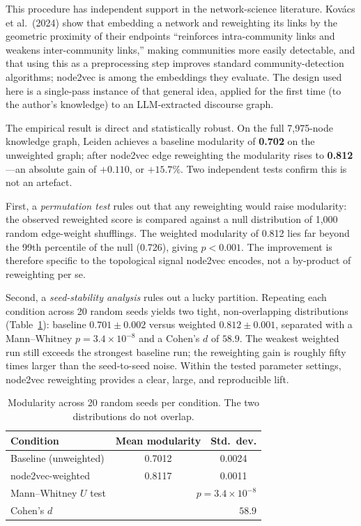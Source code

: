 \documentclass[11pt]{article}
\begin{document}
This procedure has independent support in the network-science literature. Kov\'{a}cs et al.\ (2024) show that embedding a network and reweighting its links by the geometric proximity of their endpoints ``reinforces intra-community links and weakens inter-community links,'' making communities more easily detectable, and that using this as a preprocessing step improves standard community-detection algorithms; node2vec is among the embeddings they evaluate. The design used here is a single-pass instance of that general idea, applied for the first time (to the author's knowledge) to an LLM-extracted discourse graph.

The empirical result is direct and statistically robust. On the full 7{,}975-node knowledge graph, Leiden achieves a baseline modularity of \textbf{0.702} on the unweighted graph; after node2vec edge reweighting the modularity rises to \textbf{0.812}---an absolute gain of $+0.110$, or $+15.7\%$. Two independent tests confirm this is not an artefact.

First, a \emph{permutation test} rules out that any reweighting would raise modularity: the observed reweighted score is compared against a null distribution of 1{,}000 random edge-weight shufflings. The weighted modularity of 0.812 lies far beyond the 99th percentile of the null (0.726), giving $p<0.001$. The improvement is therefore specific to the topological signal node2vec encodes, not a by-product of reweighting per se.

Second, a \emph{seed-stability analysis} rules out a lucky partition. Repeating each condition across 20 random seeds yields two tight, non-overlapping distributions (Table~\ref{tab:seed}): baseline $0.701 \pm 0.002$ versus weighted $0.812 \pm 0.001$, separated with a Mann--Whitney $p = 3.4\times10^{-8}$ and a Cohen's $d$ of $58.9$. The weakest weighted run still exceeds the strongest baseline run; the reweighting gain is roughly fifty times larger than the seed-to-seed noise. Within the tested parameter settings, node2vec reweighting provides a clear, large, and reproducible lift.

\begin{table}[h]
\centering
\small
\caption{Modularity across 20 random seeds per condition. The two distributions do not overlap.}
\label{tab:seed}
\begin{tabular}{lcc}
\toprule
\textbf{Condition} & \textbf{Mean modularity} & \textbf{Std.\ dev.} \\
\midrule
Baseline (unweighted) & 0.7012 & 0.0024 \\
node2vec-weighted     & 0.8117 & 0.0011 \\
\midrule
Mann--Whitney $U$ test & \multicolumn{2}{r}{$p = 3.4\times10^{-8}$} \\
Cohen's $d$            & \multicolumn{2}{r}{$58.9$} \\
\bottomrule
\end{tabular}
\end{table}
\end{document}

